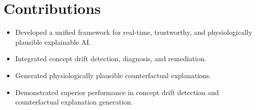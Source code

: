 \documentclass{article}
\begin{document}
\section{Contributions}
\begin{itemize}
    \item Developed a unified framework for real-time, trustworthy, and physiologically plausible explainable AI.
    \item Integrated concept drift detection, diagnosis, and remediation.
    \item Generated physiologically plausible counterfactual explanations.
    \item Demonstrated superior performance in concept drift detection and counterfactual explanation generation.
\end{itemize}
\end{document}
